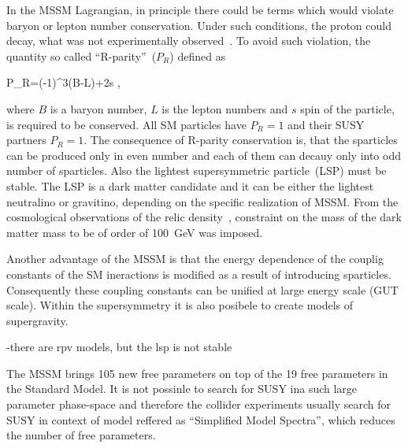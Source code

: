 In the MSSM Lagrangian, in principle there could be terms which would violate baryon or lepton number conservation. Under such conditions, the proton could decay, what was not experimentally observed~\cite{Nishino:2009aa}. To avoid such violation, the quantity so called ``R-parity''~($P_{R}$) defined as

{
P_R=(-1)^{3(B-L)+2s },
}

where $B$ is a baryon number, $L$ is the lepton numbers and $s$ spin of the particle, is required to be conserved. All SM particles have $P_{R}=1$ and their SUSY partners $P_{R}=1$. The consequence of R-parity conservation is, that the sparticles can be produced only in even number and each of them can decauy only into odd number of sparticles. Also the lightest supersymmetric particle~(LSP) must be stable. The LSP is a dark matter candidate and it can be either the lightest neutralino or gravitino, depending on the specific realization of MSSM. From the cosmological observations of the relic density~\cite{Ade:2015xua}, constraint on the mass of the dark matter mass to be of order of 100~GeV was imposed.


Another advantage of the MSSM is that the energy dependence of the couplig constants of the SM ineractions is modified as a result of introducing sparticles. Consequently these coupling constants can be unified at large energy scale (GUT scale). Within the supersymmetry it is also posibele to create models of supergravity.

-there are rpv models, but the lsp is not stable


The MSSM brings 105 new free parameters on top of the 19 free parameters in the Standard Model. It is not possinle to search for SUSY ina  such large parameter phase-space and therefore the collider experiments usually search for SUSY in context of model reffered as ``Simplified Model Spectra'', which reduces the number of free parameters.


